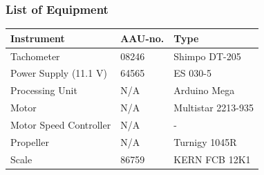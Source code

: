 \subsubsection{List of Equipment}
\begin{table}[H]
	\begin{tabular}{|l|l|p{4.3cm}|}
		\hline%
		\textbf{Instrument}                                  &  \textbf{AAU-no.}  &  \textbf{Type}                       \\
		\hline%
		Tachometer                                           &  08246           &  Shimpo DT-205		                   \\
		\hline%
	    Power Supply (11.1 V) &  64565                   &  ES 030-5                 \\
		\hline%
		Processing Unit                                   &  N/A               & Arduino Mega     \\
		\hline%
		Motor                                   &  N/A               & Multistar 2213-935     \\
		\hline%
		Motor Speed Controller                                   &  N/A               &  -      \\
		\hline%
		Propeller                                   &  N/A               & Turnigy 1045R     \\
		\hline%
		Scale                                  &  86759              & KERN FCB 12K1     \\
		\hline%
		
	\end{tabular}
\end{table}

